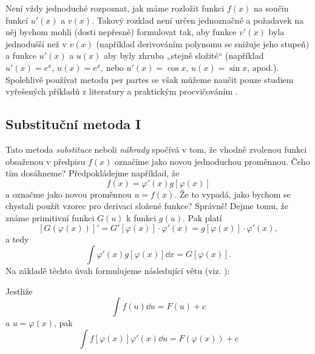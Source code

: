       

      Není vždy jednoduché rozpoznat, jak máme rozložit funkci \(f(x)\) na součin funkcí \(u'(x)\) 
      a \(v(x)\). Takový rozklad není určen jednoznačně a požadavek na něj bychom mohli (dosti 
      nepřesně) formulovat tak, aby funkce \(v'(x)\) byla jednodušší než v \(v(x)\) (například 
      derivováním polynomu se snižuje jeho stupeň) a funkce \(u'(x)\) a \(u(x)\) aby byly zhruba 
      „stejně složité“ (například \(u'(x) =e^x\), \(u(x) = e^x\), nebo \(u'(x) = \cos x\), \(u(x) = 
      \sin x\), apod.). Spolehlivě používat metodu per partes se však můžeme naučit pouze studiem 
      vyřešených příkladů z literatury a praktickým procvičováním \cite[p.~138]{Musilova2009MA1}.
  
      
  
    \subsection{Substituční metoda I}
      Tato metoda \emph{substituce} neboli \emph{náhrady} spočívá v tom, že vhodně zvolenou funkci
      obsaženou v předpisu \(f(x)\) označíme jako novou jednoduchou proměnnou. Čeho tím dosáhneme?
      Předpokládejme například, že \[f(x)=\varphi'(x)g[\varphi(x)]\] a označme jako novou proměnnou
      \(u = f(x)\). Že to vypadá, jako bychom se chystali použít vzorec pro derivaci složené funkce?
      Správně! Dejme tomu, že známe primitivní funkci \(G(u)\) k funkci \(g(u)\). Pak platí
      \begin{equation*}
        \left[G\left(\varphi(x)\right)\right]' = G'\left[\varphi(x)\right]\cdot\varphi'(x) 
        = g\left[\varphi(x)\right]\cdot\varphi'(x),     
      \end{equation*}
      a tedy
      \begin{equation*}
        \int \varphi'(x) g\left[\varphi(x)\right]\dd{x} =  G\left[\varphi(x)\right]. 
      \end{equation*}      
      Na základě těchto úvah formulujeme následující větu (viz. \cite[p.~142]{diblik2002}):
      \begin{mdframed}[style=mdmathlemma]
        \begin{lemma}\label{mai:lemma009}
          Jestliže
          \begin{equation}\label{ma:eq_subst1}
            \int{f(u)\dd{u}}=F(u)+c
          \end{equation}
          a $u=\varphi(x)$, pak
          \begin{equation}\label{ma:eq_subst2}
              \int{f[\varphi(x)]\varphi'(x)\dd{u}}=F(\varphi(x))+c
          \end{equation}
        \end{lemma}
      \end{mdframed}
  
